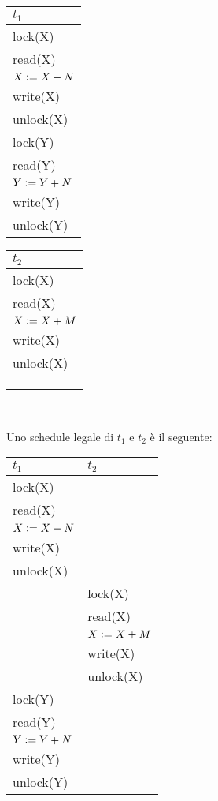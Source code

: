 \begin{multicols}{2}   

 \begin{tabular}{|l|}
     \hline
     $t_1$\\
     \hline
     lock(X)\\
     read(X)\\
     $X\vcentcolon=X-N$\\
     write(X)\\ 
     unlock(X)\\ 
     lock(Y)\\
     read(Y)\\
     $Y\vcentcolon=Y+N$\\
     write(Y)\\
     unlock(Y)\\
    \hline
 \end{tabular}
 
  \begin{tabular}{|l|}
    \hline
     $t_2$\\
     \hline
     lock(X)\\
     read(X)\\
     $X\vcentcolon=X+M$\\
     write(X)\\ 
     unlock(X)\\ 
    \\
    \\
    \\
    \hline
    \end{tabular}
    \\
  \end{multicols}

Uno schedule legale di $t_1$ e $t_2$ è il seguente:
\begin{center}
 \begin{tabular}{|l|l|}
 \hline
 $t_1$ & $t_2$\\
 \hline
     lock(X)&\\
     read(X)&\\
     $X\vcentcolon=X-N$&\\
     write(X)&\\ 
     unlock(X)&\\
     &lock(X)\\
     &read(X)\\
     &$X\vcentcolon=X+M$\\
     &write(X)\\ 
     &unlock(X)\\
     lock(Y)&\\
     read(Y)&\\
     $Y\vcentcolon=Y+N$&\\
     write(Y)&\\
     unlock(Y)&\\
     \hline
    \end{tabular}
\end{center}

